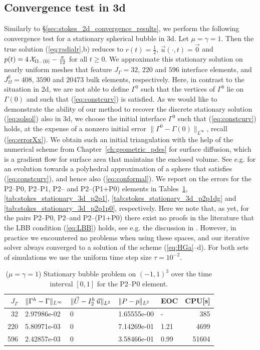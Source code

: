 \subsection{Convergence test in 3d} \label{sec:stokes_3d_convergence_results}
Similarly to \S\ref{sec:stokes_2d_convergence_results}, we perform the following
convergence test for a stationary spherical bubble in 3d. Let $\mu = \gamma =
1$. Then the true solution (\ref{eq:radialr},b) reduces to $r(t) =
\frac{1}{2}$, $\vec u(\cdot, t) = \vec 0$ and $p(t) = 4\,\mathrm{\mathcal{X}}_{\Omega_-(0)}
- \frac{\pi}{12}$ for all $t\geq0$. We approximate this stationary solution on
nearly uniform meshes that feature $J_\Gamma = 32$, $220$ and $596$ interface
elements, and $J_\Omega^0 = 408$, $3590$ and $20473$ bulk elements,
respectively. Here, in contrast to the situation in 2d, we are not able to
define $\Gamma^0$ such that the vertices of $\Gamma^0$ lie on $\Gamma(0)$ and
such that (\ref{eq:constcurv}) is satisfied. As we would like to demonstrate
the ability of our method to recover the discrete stationary solution
(\ref{eq:solsol}) also in 3d, we choose the initial interface $\Gamma^0$ such
that (\ref{eq:constcurv}) holds, at the expense of a nonzero initial error
$\| \Gamma^0 - \Gamma(0) \|_{L^\infty}$, recall (\ref{eq:errorXx}). We obtain
such an initial triangulation with the help of the numerical scheme from
Chapter~\ref{ch:geometric_pdes} for surface diffusion, which is a gradient flow
for surface area that maintains the enclosed volume. See e.g. \cite[Fig.
11]{gflows3d} for an evolution towards a polyhedral approximation of a sphere
that satisfies (\ref{eq:constcurv}), and hence also (\ref{eq:conformal}). We
report on the errors for the P2--P0, P2--P1, P2--\pdg
and P2--(P1+P0) elements in Tables~\ref{tab:stokes_stationary_3d_p2p0},
\ref{tab:stokes_stationary_3d_p2p1}, \ref{tab:stokes_stationary_3d_p2p1dg} and
\ref{tab:stokes_stationary_3d_p2p1p0}, respectively. Here we note that, as yet,
for the pairs P2--P0, P2--\pdg and P2--(P1+P0) there exist no proofs in the
literature that the LBB condition (\ref{eq:LBB}) holds, see e.g. the discussion
in \cite[Remark~8.4.3]{BoffiBF13}. However, in practice we encountered no
problems when using these spaces, and our iterative solver always converged to a
solution of the scheme (\ref{eq:HGa}--d). For both sets of simulations we use
the uniform time step size $\tau = 10^{-2}$.
\begin{table}
\center
\begin{tabular}{rllllr}
\hline
$J_\Gamma$ & $\|\Gamma^h - \Gamma\|_{L^\infty}$ & $\|\vec U - I^h_{2}\,\vec u\|_{L^2}$ & $\|P - p\|_{L^2}$ & EOC & CPU[s] \\
\hline
 32 & 2.97986e-02 & 0 & 1.65555e-00 &    - &   385 \\
220 & 5.80971e-03 & 0 & 7.14269e-01 & 1.21 &  4699 \\
596 & 2.42857e-03 & 0 & 3.58466e-01 & 0.99 & 51604 \\
\hline
\end{tabular}
\caption[Stokes 3d stationary bubble errors P2--P0]
{($\mu=\gamma=1$) Stationary bubble problem on $(-1,1)^3$ over the time
interval $[0,1]$ for the P2--P0 element.}
\label{tab:stokes_stationary_3d_p2p0}
\end{table}
